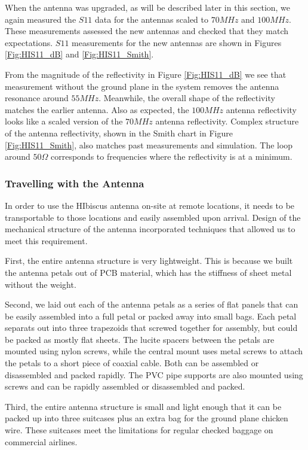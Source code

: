 When the antenna was upgraded, as will be described later in this section, we again measured the $S11$ data for the antennas scaled to $70 MHz$ and $100 MHz$. These measurements assessed the new antennas and checked that they match expectations. $S11$ measurements for the new antennas are shown in Figures \ref{Fig:HIS11_dB} and \ref{Fig:HIS11_Smith}. 

From the magnitude of the reflectivity in Figure \ref{Fig:HIS11_dB} we see that measurement without the ground plane in the system removes the antenna resonance around $55 MHz$. Meanwhile, the overall shape of the reflectivity matches the earlier antenna. Also as expected, the $100 MHz$ antenna reflectivity looks like a scaled version of the $70 MHz$ antenna reflectivity. Complex structure of the antenna reflectivity, shown in the Smith chart in Figure \ref{Fig:HIS11_Smith}, also matches past measurements and simulation. The loop around $50 \Omega$ corresponds to frequencies where the reflectivity is at a minimum. 

\subsubsection{Travelling with the Antenna}

In order to use the HIbiscus antenna on-site at remote locations, it needs to be transportable to those locations and easily assembled upon arrival. Design of the mechanical structure of the antenna incorporated techniques that allowed us to meet this requirement. 

First, the entire antenna structure is very lightweight. This is because we built the antenna petals out of PCB material, which has the stiffness of sheet metal without the weight.  

Second, we laid out each of the antenna petals as a series of flat panels that can be easily assembled into a full petal or packed away into small bags. Each petal separats out into three trapezoids that screwed together for assembly, but could be packed as mostly flat sheets. The lucite spacers between the petals are mounted using nylon screws, while the central mount uses metal screws to attach the petals to a short piece of coaxial cable. Both can be assembled or disassembled and packed rapidly. The PVC pipe supports are also mounted using screws and can be rapidly assembled or disassembled and packed. 

Third, the entire antenna structure is small and light enough that it can be packed up into three suitcases plus an extra bag for the ground plane chicken wire. These suitcases meet the limitations for regular checked baggage on commercial airlines. 

